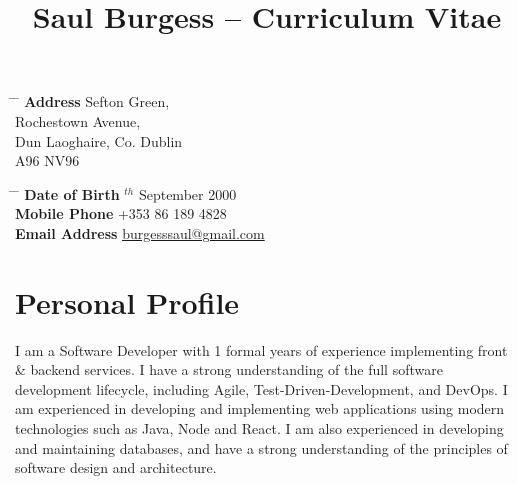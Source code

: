 \documentclass[10pt]{article} %
\begin{document}

\title{Saul Burgess -- Curriculum Vitae} %


\parbox{0.5\textwidth}{ %
    \begin{tabbing} %
        \hspace{3cm} \= \hspace{4cm} \= \kill %
        {\bf Address}  Sefton Green,\\ %
        \> Rochestown Avenue, \\
        \> Dun Laoghaire, Co. Dublin \\ %
        \> A96 NV96 \\
    \end{tabbing}} \hfill %
\parbox{0.5\textwidth}{ %
    \begin{tabbing} %
        \hspace{3cm} \= \hspace{4cm} \= \kill %
        {\bf Date of Birth} $^{th}$ September 2000 \\ %
        {\bf Mobile Phone} \> +353 86 189 4828 \\ %
        {\bf Email Address} \>
        \href{mailto:burgesssaul@gmail.com}{burgesssaul@gmail.com} \\ %
        \end{tabbing}}


\section{Personal Profile}

I am a Software Developer with 1 formal years of experience implementing front
\& backend services. I have a strong understanding of the full software
development lifecycle, including Agile, Test-Driven-Development, and DevOps. I
am experienced in developing and implementing web applications using modern
technologies such as Java, Node and React. I am also experienced in developing
and maintaining databases, and have a strong understanding of the principles of
software design and architecture.
\end{document}
